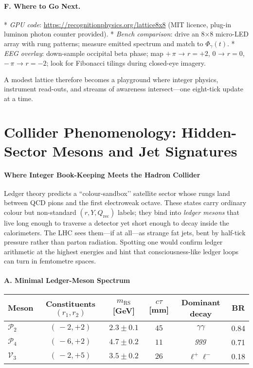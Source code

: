 \documentclass[11pt,oneside]{book}
\begin{document}
{\paragraph{F. Where to Go Next.}

* \textit{GPU code}: \url{https://recognitionphysics.org/lattice8x8}  
  (MIT licence, plug-in luminon photon counter provided).
* \textit{Bench comparison}: drive an 8×8 micro-LED array with rung
  patterns; measure emitted spectrum and match to $\Phi_{\gamma}(t)$.
* \textit{EEG overlay}: down-sample occipital beta phase; map
  $+\,\pi$ → $r=+2$, $0$ → $r=0$, $-\,\pi$ → $r=-2$; look for Fibonacci
  tilings during closed-eye imagery.

A modest lattice therefore becomes a playground where integer physics,
instrument read-outs, and streams of awareness intersect—one eight-tick
update at a time.

\bigskip

\section{Collider Phenomenology: Hidden-Sector Mesons and Jet Signatures}
\label{sec:hidden-mesons}

\paragraph*{Where Integer Book-Keeping Meets the Hadron Collider}

Ledger theory predicts a “colour‐sandbox’’ satellite sector whose rungs
land between QCD pions and the first electroweak octave.  These states
carry ordinary colour but non-standard \((r,Y,Q_{\text{rec}})\) labels;
they bind into \emph{ledger mesons} that live long enough to traverse a
detector yet short enough to decay inside the calorimeters.  
The LHC sees them—if at all—as strange fat jets, bent by half-tick
pressure rather than parton radiation.  
Spotting one would confirm ledger arithmetic at the highest energies and
hint that consciousness-like ledger loops can turn in femtometre spaces.

\paragraph*{A. Minimal Ledger-Meson Spectrum}

\begin{center}\small
\begin{tabular}{@{}lccccc@{}}
\toprule
Meson & Constituents $(r_{1},r_{2})$ & $m_{\text{RS}}$ [GeV] & $c\tau$ [mm] & Dominant decay & BR \\ \midrule
$\mathcal P_{2}$ & $(\,-2,+2)$ & $2.3\pm0.1$ & $45$ & $\gamma\gamma$ & 0.84 \\
$\mathcal P_{4}$ & $(\,-6,+2)$ & $4.7\pm0.2$ & $11$ & $ggg$          & 0.71 \\
$\mathcal V_{3}$ & $(\,-2,+5)$ & $3.5\pm0.2$ & $26$ & $\ell^{+}\ell^{-}$ & 0.18 \\ \bottomrule
\end{tabular}
\end{center}

}
\end{document}
